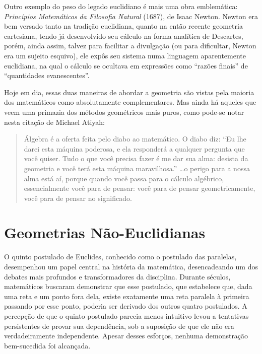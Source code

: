 \documentclass{hipatia}
\begin{document}
Outro exemplo do peso do legado 
euclidiano é mais uma obra emblemática:
\emph{Princípios Matemáticos da Filosofia Natural} (1687),
de Isaac Newton. Newton era bem versado
tanto na tradição euclidiana, quanto na então
recente geometria cartesiana, tendo já 
desenvolvido seu cálculo na forma analítica
de Descartes, porém, ainda assim, talvez 
para facilitar a divulgação (ou para dificultar,
Newton era um sujeito esquivo), ele expôs seu
sistema numa linguagem aparentemente euclidiana,
na qual o cálculo se ocultava em expressões 
como ``razões finais'' de ``quantidades evanescentes''. 

Hoje em dia, essas duas maneiras de
abordar a geometria são vistas pela
maioria dos matemáticos como 
absolutamente complementares. 
Mas ainda há aqueles que veem uma
primazia dos métodos geométricos 
mais puros, como pode-se notar 
nesta citação de Michael Atiyah:
\begin{quote}
    Álgebra é a oferta feita pelo diabo ao matemático. 
		O diabo diz: ``Eu lhe darei esta máquina poderosa, 
		e ela responderá a qualquer pergunta que você quiser. 
		Tudo o que você precisa fazer é me dar sua alma: 
		desista da geometria e você terá esta máquina maravilhosa.''
		\dots o perigo para a nossa alma está aí, porque quando 
		você passa para o cálculo algébrico, essencialmente 
		você para de pensar: você para de pensar geometricamente, 
		você para de pensar no significado. \cite[p. xvii]{Needham2021}
\end{quote}

\section{Geometrias Não-Euclidianas}

O quinto postulado de Euclides, conhecido como o postulado
das paralelas, desempenhou um papel central na história da
matemática, desencadeando um dos debates mais profundos e
transformadores da disciplina. Durante séculos, matemáticos
buscaram demonstrar que esse postulado, que estabelece que,
dada uma reta e um ponto fora dela, existe exatamente uma
reta paralela à primeira passando por esse ponto, poderia
ser derivado dos outros quatro postulados. A percepção de
que o quinto postulado parecia menos intuitivo levou a
tentativas persistentes de provar sua dependência, sob a
suposição de que ele não era verdadeiramente independente.
Apesar desses esforços, nenhuma demonstração bem-sucedida
foi alcançada.
\end{document}
